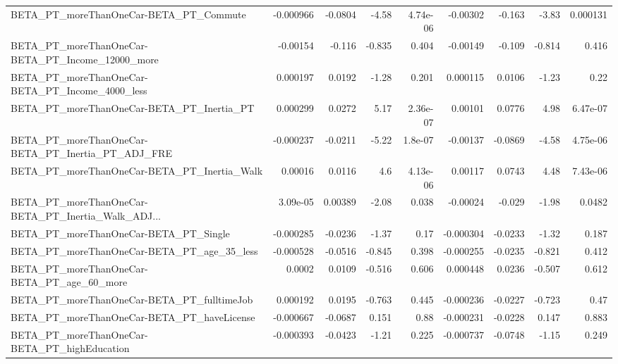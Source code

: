 \begin{tabular}{lrrrrrrrr}
BETA\_PT\_moreThanOneCar-BETA\_PT\_Commute             &   -0.000966 &      -0.0804 &    -4.58 & 4.74e-06 &   -0.00302 &      -0.163 &        -3.83 &      0.000131 \\
BETA\_PT\_moreThanOneCar-BETA\_PT\_Income\_12000\_more   &    -0.00154 &       -0.116 &   -0.835 &    0.404 &   -0.00149 &      -0.109 &       -0.814 &         0.416 \\
BETA\_PT\_moreThanOneCar-BETA\_PT\_Income\_4000\_less    &    0.000197 &       0.0192 &    -1.28 &    0.201 &   0.000115 &      0.0106 &        -1.23 &          0.22 \\
BETA\_PT\_moreThanOneCar-BETA\_PT\_Inertia\_PT          &    0.000299 &       0.0272 &     5.17 & 2.36e-07 &    0.00101 &      0.0776 &         4.98 &      6.47e-07 \\
BETA\_PT\_moreThanOneCar-BETA\_PT\_Inertia\_PT\_ADJ\_FRE  &   -0.000237 &      -0.0211 &    -5.22 &  1.8e-07 &   -0.00137 &     -0.0869 &        -4.58 &      4.75e-06 \\
BETA\_PT\_moreThanOneCar-BETA\_PT\_Inertia\_Walk        &     0.00016 &       0.0116 &      4.6 & 4.13e-06 &    0.00117 &      0.0743 &         4.48 &      7.43e-06 \\
BETA\_PT\_moreThanOneCar-BETA\_PT\_Inertia\_Walk\_ADJ... &    3.09e-05 &      0.00389 &    -2.08 &    0.038 &   -0.00024 &      -0.029 &        -1.98 &        0.0482 \\
BETA\_PT\_moreThanOneCar-BETA\_PT\_Single              &   -0.000285 &      -0.0236 &    -1.37 &     0.17 &  -0.000304 &     -0.0233 &        -1.32 &         0.187 \\
BETA\_PT\_moreThanOneCar-BETA\_PT\_age\_35\_less         &   -0.000528 &      -0.0516 &   -0.845 &    0.398 &  -0.000255 &     -0.0235 &       -0.821 &         0.412 \\
BETA\_PT\_moreThanOneCar-BETA\_PT\_age\_60\_more         &      0.0002 &       0.0109 &   -0.516 &    0.606 &   0.000448 &      0.0236 &       -0.507 &         0.612 \\
BETA\_PT\_moreThanOneCar-BETA\_PT\_fulltimeJob         &    0.000192 &       0.0195 &   -0.763 &    0.445 &  -0.000236 &     -0.0227 &       -0.723 &          0.47 \\
BETA\_PT\_moreThanOneCar-BETA\_PT\_haveLicense         &   -0.000667 &      -0.0687 &    0.151 &     0.88 &  -0.000231 &     -0.0228 &        0.147 &         0.883 \\
BETA\_PT\_moreThanOneCar-BETA\_PT\_highEducation       &   -0.000393 &      -0.0423 &    -1.21 &    0.225 &  -0.000737 &     -0.0748 &        -1.15 &         0.249 \\

\end{tabular}
